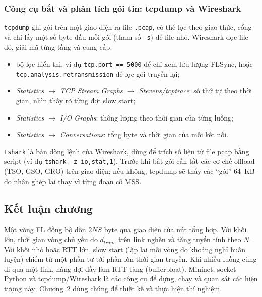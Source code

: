 \subsubsection{Công cụ bắt và phân tích gói tin: tcpdump và Wireshark}
\texttt{tcpdump} ghi gói trên một giao diện ra file \texttt{.pcap}, có thể lọc theo giao thức, cổng và chỉ lấy một số byte đầu mỗi gói (tham số \texttt{-s}) để file nhỏ. Wireshark đọc file đó, giải mã từng tầng và cung cấp:
\begin{itemize}
    \item bộ lọc hiển thị, ví dụ \texttt{tcp.port == 5000} để chỉ xem lưu lượng FLSync, hoặc \nolinkurl{tcp.analysis.retransmission} để lọc gói truyền lại;
    \item \emph{Statistics $\rightarrow$ TCP Stream Graphs $\rightarrow$ Stevens/tcptrace}: số thứ tự theo thời gian, nhìn thấy rõ từng đợt slow start;
    \item \emph{Statistics $\rightarrow$ I/O Graphs}: thông lượng theo thời gian của từng luồng;
    \item \emph{Statistics $\rightarrow$ Conversations}: tổng byte và thời gian của mỗi kết nối.
\end{itemize}
\texttt{tshark} là bản dòng lệnh của Wireshark, dùng để trích số liệu từ file pcap bằng script (ví dụ \texttt{tshark -z io,stat,1}). Trước khi bắt gói cần tắt các cơ chế offload (TSO, GSO, GRO) trên giao diện; nếu không, tcpdump sẽ thấy các ``gói'' 64~KB do nhân ghép lại thay vì từng đoạn cỡ MSS.

\subsection{Kết luận chương}
Một vòng FL đồng bộ dồn $2NS$ byte qua giao diện của nút tổng hợp. Với khối lớn, thời gian vòng chủ yếu do $d_{trans}$ trên link nghẽn và tăng tuyến tính theo $N$. Với khối nhỏ hoặc RTT lớn, slow start (lặp lại mỗi vòng do khoảng nghỉ huấn luyện) chiếm từ một phần tư tới phần lớn thời gian truyền. Khi nhiều luồng cùng đi qua một link, hàng đợi đầy làm RTT tăng (bufferbloat). Mininet, socket Python và tcpdump/Wireshark là các công cụ để dựng, chạy và quan sát các hiện tượng này; Chương~2 dùng chúng để thiết kế và thực hiện thí nghiệm.

\cleardoublepage
